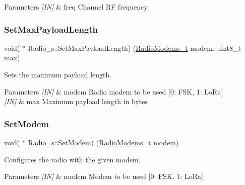 \begin{DoxyParams}{Parameters}
{\em \mbox{[}\+I\+N\mbox{]}} & freq Channel RF frequency \\
\hline
\end{DoxyParams}
\mbox{\label{group__LORA_ga182fc8f265a2d02d64f3ee1c6dd5906f}} 
\subsubsection{\texorpdfstring{Set\+Max\+Payload\+Length}{SetMaxPayloadLength}}
{\footnotesize\ttfamily void( $\ast$ Radio\+\_\+s\+::\+Set\+Max\+Payload\+Length) (\hyperlink{group__LORA_ga992ef7a5b7f52975ba7bd8dd97740057}{Radio\+Modems\+\_\+t} modem, uint8\+\_\+t max)}



Sets the maximum payload length. 


\begin{DoxyParams}{Parameters}
{\em \mbox{[}\+I\+N\mbox{]}} & modem Radio modem to be used \mbox{[}0\+: F\+SK, 1\+: Lo\+Ra\mbox{]} \\
\hline
{\em \mbox{[}\+I\+N\mbox{]}} & max Maximum payload length in bytes \\
\hline
\end{DoxyParams}
\mbox{\label{group__LORA_ga92515d5b16f5093727b90256a8929b82}} 
\subsubsection{\texorpdfstring{Set\+Modem}{SetModem}}
{\footnotesize\ttfamily void( $\ast$ Radio\+\_\+s\+::\+Set\+Modem) (\hyperlink{group__LORA_ga992ef7a5b7f52975ba7bd8dd97740057}{Radio\+Modems\+\_\+t} modem)}



Configures the radio with the given modem. 


\begin{DoxyParams}{Parameters}
{\em \mbox{[}\+I\+N\mbox{]}} & modem Modem to be used \mbox{[}0\+: F\+SK, 1\+: Lo\+Ra\mbox{]} \\
\hline
\end{DoxyParams}
\mbox{\label{group__LORA_ga33681fa99af4bf37517e1ba1107e1877}} 
